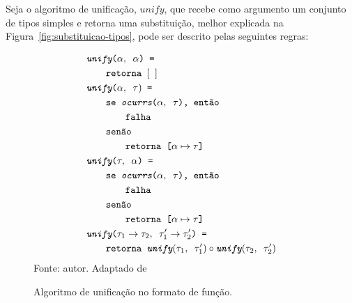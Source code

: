 Seja o algoritmo de unificação, $unify$, que recebe como argumento um conjunto de tipos simples e retorna uma substituição, melhor explicada na Figura~\ref{fig:substituicao-tipos}, pode ser descrito pelas seguintes regras:


\begin{figure}[ht!]
  \caption{Algoritmo de unificação no formato de função.}
  \centering
  \begin{align*}
    & \texttt{\Unify($\alpha, \Whitespace \alpha$) = }   \\
    & \qquad{}\texttt{\Return \Whitespace $[\Whitespace]$}            \\
    & \texttt{\Unify($\alpha, \Whitespace \tau)$ = }              \\
    & \qquad{}\texttt{\If \Whitespace \Occurs($\alpha, \Whitespace \tau$), \Then}     \\
    & \qquad{}\qquad{}\texttt{\Fail}     \\
    & \qquad{}\texttt{\Else}     \\
    & \qquad{}\qquad{}\texttt{\Return \Whitespace [$\alpha\mapsto\tau$]}     \\
    & \texttt{\Unify($\tau, \Whitespace \alpha$) = }                \\
    & \qquad{}\texttt{\If \Whitespace \Occurs($\alpha, \Whitespace \tau$), \Then}     \\
    & \qquad{}\qquad{}\texttt{\Fail}     \\
    & \qquad{}\texttt{\Else}     \\
    & \qquad{}\qquad{}\texttt{\Return \Whitespace [$\alpha\mapsto\tau$]}     \\
    & \texttt{\Unify($\tau_1 \to \tau_2, \Whitespace \tau_1' \to \tau_2'$) = }                \\
    & \qquad{}\texttt{\Return \Whitespace $\Unify(\tau_1, \Whitespace \tau_1') \circ \Unify(\tau_2, \Whitespace \tau_2')$}
  \end{align*}
  \small{Fonte: autor. Adaptado de~\cite{RIBEIRO2016}}\label{algo:unify}
\end{figure}

